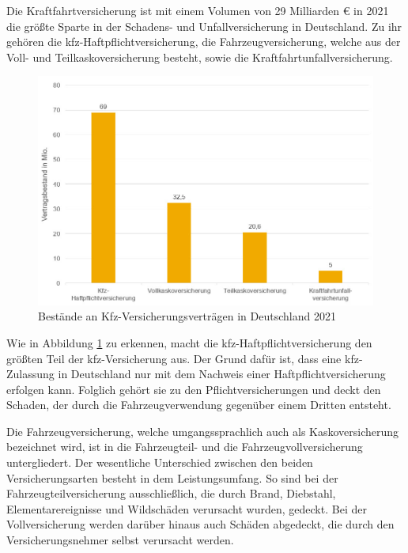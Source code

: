 Die Kraftfahrtversicherung ist mit einem Volumen von 29 Milliarden € in 2021 die größte Sparte in der Schadens- und Unfallversicherung in Deutschland.\autocite[Vgl.][]{GDVSUV} Zu ihr gehören die \ac{kfz}-Haftpflichtversicherung, die Fahrzeugversicherung, welche aus der Voll- und Teilkaskoversicherung besteht, sowie die Kraftfahrtunfallversicherung.\autocite[Vgl.][S. 8]{MURINGER2000}

\begin{figure}[h]
    \centering
    \includegraphics[width=1\textwidth]{img/KfzV_Bestände_an_Verträgen_2021.jpg}
    \caption[Bestände an Kfz-Versicherungsverträgen in Deutschland 2021]{Bestände an Kfz-Versicherungsverträgen in Deutschland 2021\autocite{KfzVVBestand}}
    \label{fig:KfzVVBestand}
\end{figure}

Wie in Abbildung \ref{fig:KfzVVBestand} zu erkennen, macht die \ac{kfz}-Haftpflichtversicherung den größten Teil der \ac{kfz}-Versicherung aus. Der Grund dafür ist, dass eine \ac{kfz}-Zulassung in Deutschland nur mit dem Nachweis einer Haftpflichtversicherung erfolgen kann. Folglich gehört sie zu den Pflichtversicherungen und deckt den Schaden, der durch die Fahrzeugverwendung gegenüber einem Dritten entsteht. \autocite[Vgl.][S. 81]{STADLER2008}

Die Fahrzeugversicherung, welche umgangssprachlich auch als Kaskoversicherung bezeichnet wird, ist in die Fahrzeugteil- und die Fahrzeugvollversicherung untergliedert. Der wesentliche Unterschied zwischen den beiden Versicherungsarten besteht in dem Leistungsumfang. So sind bei der Fahrzeugteilversicherung ausschließlich, die durch Brand, Diebstahl, Elementarereignisse und Wildschäden verursacht wurden, gedeckt. Bei der Vollversicherung werden darüber hinaus auch Schäden abgedeckt, die durch den Versicherungsnehmer selbst verursacht werden.\autocite[Vgl.][S. 48]{FELTEN2012}

